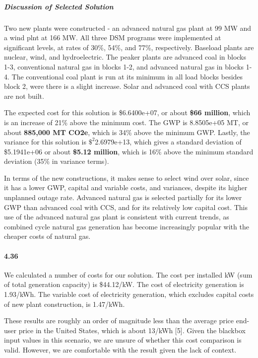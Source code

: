\documentclass{article}
\begin{document}
	\subparagraph{Discussion of Selected Solution}
		Two new plants were constructed - an advanced natural gas plant at 99 MW and a wind plnt at 166 MW. All three DSM programs were implemented at significant levels, at rates of 30\%, 54\%, and 77\%, respectively. Baseload plants are nuclear, wind, and hydroelectric. The peaker plants are advanced coal in blocks 1-3, conventional natural gas in blocks 1-2, and advanced natural gas in blocks 1-4. The conventional coal plant is run at its minimum in all load blocks besides block 2, were there is a slight increase. Solar and advanced coal with CCS plants are not built.
		
		The expected cost for this solution is \$6.6400e+07, or about \textbf{\$66 million}, which is an increase of 21\% above the minimum cost. The GWP is 8.8505e+05 MT, or about \textbf{885,000 MT CO2e}, which is 34\% above the minimum GWP. Lastly, the variance for this solution is $\$^2$2.6979e+13, which gives a standard deviation of \$5.1941e+06 or about \textbf{\$5.12 million}, which is 16\% above the minimum standard deviation (35\% in variance terms). 
		
		In terms of the new constructions, it makes sense to select wind over solar, since it has a lower GWP, capital and variable costs, and variances, despite its higher unplanned outage rate. Advanced natural gas is selected partially for its lower GWP than advanced coal with CCS, and for its relatively low capital cost. This use of the advanced natural gas plant is consistent with current trends, as combined cycle natural gas generation has become increasingly popular with the cheaper costs of natural gas.
		
		

\paragraph{4.36}
	We calculated a number of costs for our solution. The cost per installed kW (sum of total generation capacity) is \$44.12/kW. The cost of electricity generation is 1.93\textcent/kWh. The variable cost of electricity generation, which excludes capital costs of new plant construction, is 1.47\textcent/kWh.
	
	These results are roughly an order of magnitude less than the average price end-user price in the United States, which is about 13\textcent/kWh [5]. Given the blackbox input values in this scenario, we are unsure of whether this cost comparison is valid. However, we are comfortable with the result given the lack of context.
	
\end{document}
